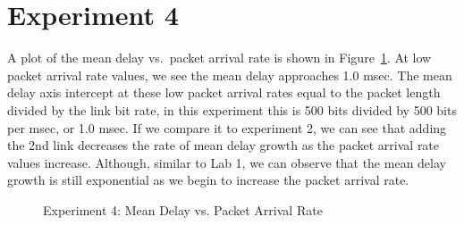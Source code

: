 \section*{Experiment 4}

A plot of the mean delay vs.\ packet arrival rate is shown in Figure~\ref{fig:exp4}.
At low packet arrival rate values, we see the mean delay approaches 1.0 msec.
The mean delay axis intercept at these low packet arrival rates equal to the packet length divided by the link bit rate, in this experiment this is 500 bits divided by 500 bits per msec, or 1.0 msec.
If we compare it to experiment 2, we can see that adding the 2nd link decreases the rate of mean delay growth as the packet arrival rate values increase.
Although, similar to Lab 1, we can observe that the mean delay growth is still exponential as we begin to increase the packet arrival rate.


\begin{figure}[htp]
    \centering
    \caption{Experiment 4: Mean Delay vs. Packet Arrival Rate}
    \label{fig:exp4}
\end{figure}